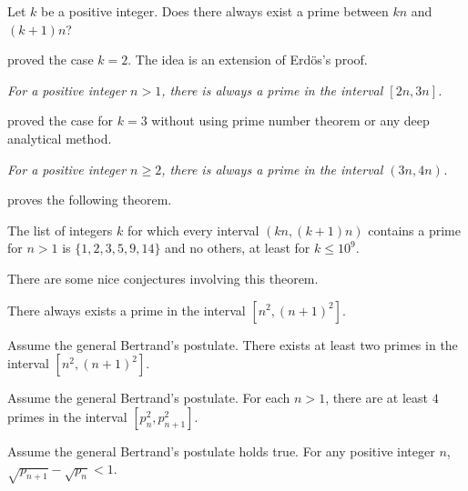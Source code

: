 \documentclass{subfile}
\begin{document}
	\begin{problem}
		Let $k$ be a positive integer. Does there always exist a prime between $kn$ and $(k+1)n$?
	\end{problem}
\textcite{bachraoui_2006} proved the case $k=2$. The idea is an extension of Erd\"{o}s's proof.
	\begin{theorem}[Bachraoui]\slshape
		For a positive integer $n>1$, there is always a prime in the interval $[2n,3n]$.
	\end{theorem}
\textcite{loo_2011} proved the case for $k=3$ without using prime number theorem or any deep analytical method.
	\begin{theorem}[Loo]\slshape
		For a positive integer $n\geq2$, there is always a prime in the interval $(3n,4n)$.
	\end{theorem}
\textcite{moses_shevelev_greathouse_2013} proves the following theorem.
	\begin{theorem}
		The list of integers $k$ for which every interval $(kn,(k+1)n)$ contains a prime for $n>1$ is $\{1,2,3,5,9,14\}$ and no others, at least for $k\leq10^9$.
	\end{theorem}
There are some nice conjectures involving this theorem.
	\begin{conjecture}
		There always exists a prime in the interval $[n^2,(n+1)^2]$.
	\end{conjecture}

	\begin{theorem}
		Assume the general Bertrand's postulate. There exists at least two primes in the interval $[n^2,(n+1)^2]$.
	\end{theorem}

	\begin{theorem}
		Assume the general Bertrand's postulate. For each $n>1$, there are at least $4$ primes in the interval $[p_n^2,p_{n+1}^2]$.
	\end{theorem}

	\begin{theorem}
		Assume the general Bertrand's postulate holds true. For any positive integer $n$, $\sqrt{p_{n+1}}-\sqrt{p_n}<1$.
	\end{theorem}
\end{document}
